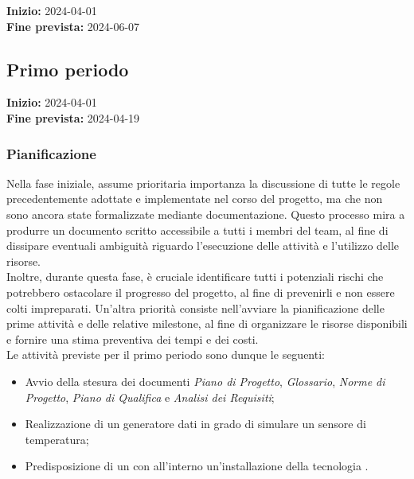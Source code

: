\textbf{Inizio:} 2024-04-01\\
\textbf{Fine prevista:} 2024-06-07
\subsection{Primo periodo} \label{sec:1_rtb}
\textbf{Inizio:} 2024-04-01\\
\textbf{Fine prevista:} 2024-04-19
\subsubsection{Pianificazione}
Nella fase iniziale, assume prioritaria importanza la discussione di tutte le regole precedentemente adottate e implementate nel corso del progetto, ma che non sono ancora state formalizzate mediante documentazione. Questo processo mira a produrre un documento scritto accessibile a tutti i membri del team, al fine di dissipare eventuali ambiguità riguardo l'esecuzione delle attività e l'utilizzo delle risorse.
\\
Inoltre, durante questa fase, è cruciale identificare tutti i potenziali rischi che potrebbero ostacolare il progresso del progetto, al fine di prevenirli e non essere colti impreparati. Un'altra priorità consiste nell'avviare la pianificazione delle prime attività e delle relative milestone, al fine di organizzare le risorse disponibili e fornire una stima preventiva dei tempi e dei costi. \\
Le attività previste per il primo periodo sono dunque le seguenti:
\begin{itemize}
\setlength{\itemsep}{0em}
    \item Avvio della stesura dei documenti \textit{Piano di Progetto}, \textit{Glossario}, \textit{Norme di Progetto}, \textit{Piano di Qualifica} e \textit{Analisi dei Requisiti};
    \item Realizzazione di un generatore dati in grado di simulare un sensore di temperatura;
    \item Predisposizione di un   con all'interno un'installazione della tecnologia .
\end{itemize}

